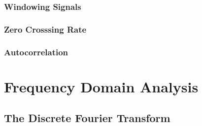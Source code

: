 \subsubsection{Windowing Signals}
\label{ssubs:windowing_signals}


\subsubsection{Zero Crosssing Rate}
\label{ssubs:Zero Crosssing Rate}


\subsubsection{Autocorrelation}
\label{ssubs:autocorrelation}



\section{Frequency Domain Analysis}
\label{sec:freq_domain_analysis}


\subsection{The Discrete Fourier Transform}
\label{sub:discrete_fourier_transform}
